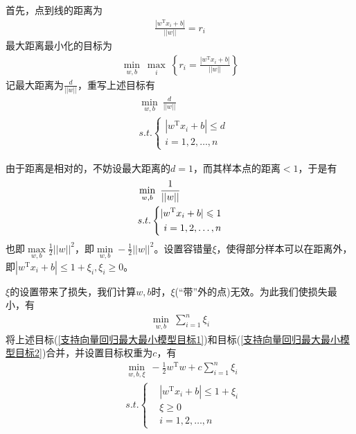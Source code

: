    首先，点到线的距离为
    \begin{align*}
    \frac{|w^\mathrm{T}x_i+b|}{||w||} = r_i
    \end{align*}
    最大距离最小化的目标为
    \begin{align*}
    \min_{w,b}\ \max_{i}\ \left\{ r_i = \frac{|w^\mathrm{T}x_i+b|}{||w||}\right\}
    \end{align*}
    记最大距离为$\frac{d}{||w||}$，重写上述目标有
    \begin{align*}
    & \min_{w,b} \ \frac{d}{||w||}\\
    & s.t.\left\{
    \begin{aligned}
    |w^\mathrm{T}x_i+b| \leqslant d\\
    i=1,2,\dots,n
    \end{aligned}
    \right.
    \end{align*}
    \par
    由于距离是相对的，不妨设最大距离的$d=1$，而其样本点的距离$<1$，于是有
    \begin{align}
    \label{支持向量回归最大最小模型目标1}
    & \min_{w,b} \ \frac{1}{||w||}\\
    & s.t.\left\{
    \begin{aligned}
    |w^\mathrm{T}x_i +b| \leqslant 1\\
    i=1,2,\dots,n
    \end{aligned}
    \right.\notag
    \end{align}
    也即$\max\limits_{w,b}\frac{1}{2}||w||^2$，即$\min\limits_{w,b}-\frac{1}{2}||w||^2$。设置容错量$\xi$，使得部分样本可以在距离外，即$|w^\mathrm{T}x_i+b| \leqslant 1+\xi_i,\xi_i \geqslant 0$。
    \par
    $\xi$的设置带来了损失，我们计算$w,b$时，$\xi$(“带”外的点)无效。为此我们使损失最小，有
    \begin{align}
    \label{支持向量回归最大最小模型目标2}
    \min_{w,b} \ \sum_{i=1}^n \xi_i
    \end{align}
    将上述目标(\ref{支持向量回归最大最小模型目标1})和目标(\ref{支持向量回归最大最小模型目标2})合并，并设置目标权重为$c$，有
    \begin{align*}
    & \min_{w,b,\xi} \ -\frac{1}{2}w^\mathrm{T}w +c \sum_{i=1}^n \xi_i\\
    & s.t.\left\{
    \begin{aligned}
    & |w^\mathrm{T}x_i+b| \leqslant 1+\xi_i\\
    & \xi \geqslant 0\\
    & i=1,2,\dots,n
    \end{aligned}
    \right.
    \end{align*}
